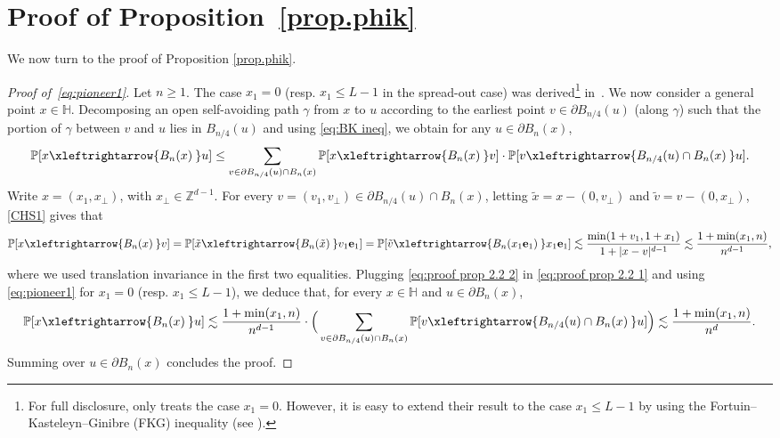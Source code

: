 \documentclass[11pt,a4paper]{article}
\numberwithin{equation}{section}
\theoremstyle{plain}
\theoremstyle{definition}
\newcommand{\connect}{\xleftrightarrow}
\begin{document}
\section{Proof of Proposition~\ref{prop.phik} } 
We now turn to the proof of Proposition \ref{prop.phik}.
\begin{proof}[Proof of~\eqref{eq:pioneer1}] Let $n\geq 1$.
The case $x_1=0$ (resp. $x_1\leq L-1$ in the spread-out case) was derived\footnote{For full disclosure, \cite{ChatterjeeHanson} only treats the case $x_1=0$. However, it is easy to extend their result to the case $x_1\leq L-1$ by using the Fortuin--Kasteleyn--Ginibre (FKG) inequality (see \cite[Chapter~2.2]{GrimmettPercolation1999}).} in~\cite[Lemma~26]{ChatterjeeHanson}. We now consider a general point $x \in \mathbb H$. Decomposing an open self-avoiding path $\gamma$ from $x$ to $u$ according to the earliest point $v\in \partial B_{n/4}(u)$ (along $\gamma$) such that the portion of $\gamma$ between $v$ and $u$ lies in $B_{n/4}(u)$ and using \eqref{eq:BK ineq}, we obtain
for any $u\in \partial B_n(x)$,
\begin{equation}\label{eq:proof prop 2.2 1}
\mathbb P[x \connect{B_n(x)\:} u] \le \sum_{v \in \partial B_{n/4}(u) \cap B_n(x)} \mathbb P[x \connect{B_n(x)\:} v] \cdot \mathbb P[  v \connect{B_{n/4}(u) \cap B_n(x)\:} u].
\end{equation}
Write $x=(x_1,x_\bot)$, with $x_\bot\in \mathbb Z^{d-1}$. For every $v=(v_1,v_\bot)\in \partial B_{n/4}(u)\cap B_n(x)$, letting $\tilde{x}=x-(0,v_\bot)$ and $\tilde{v}=v-(0,x_\bot)$, \eqref{CHS1} gives that
\begin{equation}\label{eq:proof prop 2.2 2}  
	\mathbb P[x\connect{B_n(x)\:}v]=\mathbb P[\tilde{x}\connect{B_n(\tilde{x})\:}v_1\mathbf{e}_1]=\mathbb P[\tilde{v}\connect{B_n(x_1\mathbf{e}_1)\:}x_1\mathbf{e}_1]\lesssim \frac{\min(1+v_1,1+x_1)}{1+|x-v|^{d-1}}\lesssim \frac{1+\min(x_1,n)}{n^{d-1}},
\end{equation}
where we used translation invariance in the first two equalities. Plugging \eqref{eq:proof prop 2.2 2} in \eqref{eq:proof prop 2.2 1} and using  \eqref{eq:pioneer1} for $x_1=0$ (resp. $x_1\leq L-1$), we deduce that, for every $x\in \mathbb H$ and $u\in \partial B_n(x)$,
\begin{equation}  
\mathbb P[x \connect{B_n(x)\:} u]  \lesssim  \frac{ 1+\min(x_1,n)}{n^{d-1}} \cdot \Big(\sum_{v \in \partial B_{n/4}(u) \cap B_n(x)}  \mathbb P[  v \connect{B_{n/4}(u) \cap B_n(x)\:} u]\Big)  \lesssim \frac {1+\min(x_1,n)}{n^d}.
\end{equation}
Summing over $u \in \partial B_n(x)$ concludes the proof. 
\end{proof} 
\end{document}
